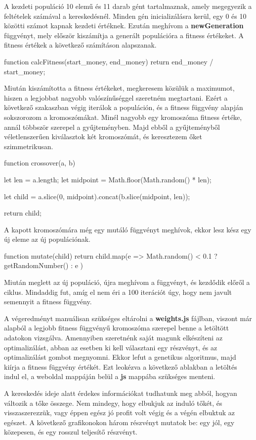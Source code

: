 A kezdeti populáció 10 elemű és 11 darab gént tartalmaznak, amely megegyezik a feltételek számával a kereskedésnél. Minden gén inicializálásra kerül, egy 0 és 10 közötti számot kapnak kezdeti értéknek. Ezután meghívom a \textbf{newGeneration} függvényt, mely először kiszámítja a generált populációra a fitness értékeket. A fitness értékek a következő számításon alapszanak.
\begin{javascript}
function calcFitness(start_money, end_money) {
    return end_money / start_money;
}
\end{javascript}
Miután kiszámította a fitness értékeket, megkeresem közülük a maximumot, hiszen a legjobbat nagyobb valószínűséggel szeretném megtartani. Ezért a következő szakaszban végig iterálok a populáción, és a fitness függvény alapján sokszorozom a kromoszómákat. Minél nagyobb egy kromoszóma fitness értéke, annál többször szerepel a gyűjteményben. Majd ebből a gyűjteményből véletlenszerűen kiválasztok két kromoszómát, és keresztezem őket szimmetrikusan.
\begin{javascript}
function crossover(a, b) {
    let len = a.length;
    let midpoint = Math.floor(Math.random() * len);

    let child = a.slice(0, midpoint).concat(b.slice(midpoint, len));

    return child;
}
\end{javascript}
A kapott kromoszómára még egy mutáló függvényt meghívok, ekkor lesz kész egy új eleme az új populációnak.
\begin{javascript}
function mutate(child) {
    return child.map(e =>
        Math.random() < 0.1 ? getRandomNumber() : e
    )
}
\end{javascript}
Miután meglett az új populáció, újra meghívom a függvényt, és kezdődik előről a ciklus. Mindaddig fut, amíg el nem éri a 100 iterációt úgy, hogy nem javult semennyit a fitness függvény.

A végeredményt manuálisan szükséges eltárolni a \textbf{weights.js} fájlban, viszont már alapból a legjobb fitness függvényű kromoszóma szerepel benne a letöltött adatokon vizsgálva. Amennyiben szeretnénk saját magunk elkészíteni az optimalizálást, abban az esetben ki kell választani egy részvényt, és az optimalizálást gombot megnyomni. Ekkor lefut a genetikus algoritmus, majd kiírja a fitness függvény értékét. Ezt leokézva a következő ablakban a letöltés indul el, a weboldal mappáján belül a \textbf{js} mappába szükséges menteni.

A kereskedés ideje alatt érdekes információkat tudhatunk meg abból, hogyan változik a tőke összege. Nem mindegy, hogy elbukjuk az induló tőkét, és visszaszerezzük, vagy éppen egész jó profit volt végig és a végén elbuktuk az egészet. A következő grafikonokon három részvényt mutatok be: egy jól, egy közepesen, és egy rosszul teljesítő részvényt.

